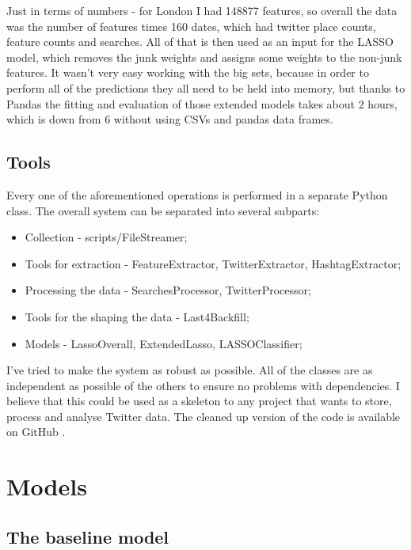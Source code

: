 \documentclass[minf,frontabs,twoside,singlespacing,parskip]{infthesis}
\begin{document}
Just in terms of numbers - for London I had 148877 features, so overall the data was the number of features times 160 dates, which had twitter place counts, feature counts and searches. All of that is then used as an input for the LASSO model, which removes the junk weights and assigns some weights to the non-junk features. It wasn't very easy working with the big sets, because in order to perform all of the predictions they all need to be held into memory, but thanks to Pandas \cite{pandas} the fitting and evaluation of those extended models takes about 2 hours, which is down from 6 without using CSVs and pandas data frames.


\section{Tools}


Every one of the aforementioned operations is performed in a separate Python class. The overall system can be separated into several subparts:
\begin{itemize}
\item Collection - scripts/FileStreamer; 
\item Tools for extraction - FeatureExtractor, TwitterExtractor, HashtagExtractor;
\item Processing the data - SearchesProcessor, TwitterProcessor;
\item Tools for the shaping the data - Last4Backfill;
\item Models - LassoOverall, ExtendedLasso, LASSOClassifier;
\end{itemize}


I've tried to make the system as robust as possible. All of the classes are as independent as possible of the others to ensure no problems with dependencies. I believe that this could be used as a skeleton to any project that wants to store, process and analyse Twitter data. The cleaned up version of the code is available on GitHub \cite{code}.



\chapter{Models}
\label{chap:model}

\section{The baseline model}
\label{sec:baseline}
\end{document}
